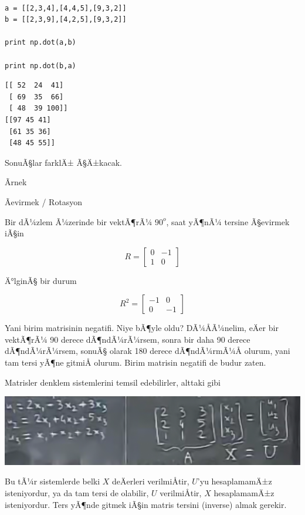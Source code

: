 \documentclass[12pt,fleqn]{article}\usepackage{../../common}
\begin{document}
\begin{verbatim}

a = [[2,3,4],[4,4,5],[9,3,2]]
b = [[2,3,9],[4,2,5],[9,3,2]]

print np.dot(a,b)

print np.dot(b,a)
\end{verbatim}

\begin{verbatim}
[[ 52  24  41]
 [ 69  35  66]
 [ 48  39 100]]
[[97 45 41]
 [61 35 36]
 [48 45 55]]
\end{verbatim}

SonuÃ§lar farklÄ± Ã§Ä±kacak. 

Ãrnek

Ãevirmek / Rotasyon

Bir dÃ¼zlem Ã¼zerinde bir vektÃ¶rÃ¼ $90^o$, saat yÃ¶nÃ¼ tersine 
Ã§evirmek iÃ§in 

$$ R =
\left[\begin{array}{rr}
0 & -1 \\
1 & 0
\end{array}\right]
 $$

Ä°lginÃ§ bir durum

$$ R^2 =
\left[\begin{array}{rr}
-1 & 0 \\
0 & -1
\end{array}\right]
 $$

Yani birim matrisinin negatifi. Niye bÃ¶yle oldu? DÃ¼ÅÃ¼nelim, eÄer
bir vektÃ¶rÃ¼ 90 derece dÃ¶ndÃ¼rÃ¼rsem, sonra bir daha 90 derece 
dÃ¶ndÃ¼rÃ¼rsem, sonuÃ§ 
olarak 180 derece dÃ¶ndÃ¼rmÃ¼Å olurum, yani tam tersi yÃ¶ne gitmiÅ 
olurum. Birim 
matrisin negatifi de budur zaten. 

Matrisler denklem sistemlerini temsil edebilirler, alttaki gibi
\begin{center}
\includegraphics[width=14.9cm]{3_5.png}
\end{center}
Bu tÃ¼r sistemlerde belki $X$ deÄerleri verilmiÅtir, $U$'yu 
hesaplamamÄ±z
isteniyordur, ya da tam tersi de olabilir, $U$ verilmiÅtir, $X$
hesaplamamÄ±z isteniyordur. Ters yÃ¶nde gitmek iÃ§in matris tersini 
(inverse)
almak gerekir.
\end{document}
